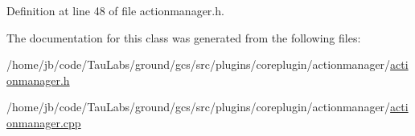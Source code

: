 \-Definition at line 48 of file actionmanager.\-h.



\-The documentation for this class was generated from the following files\-:\begin{DoxyCompactItemize}
\item 
/home/jb/code/\-Tau\-Labs/ground/gcs/src/plugins/coreplugin/actionmanager/\hyperlink{actionmanager_8h}{actionmanager.\-h}\item 
/home/jb/code/\-Tau\-Labs/ground/gcs/src/plugins/coreplugin/actionmanager/\hyperlink{actionmanager_8cpp}{actionmanager.\-cpp}\end{DoxyCompactItemize}
